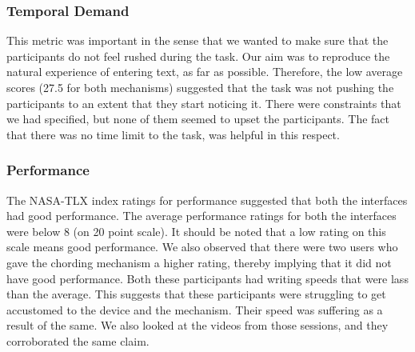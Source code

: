 \subsubsection{Temporal Demand}
This metric was important in the sense that we wanted to make sure that the participants do not feel rushed during the task. Our aim was to reproduce the natural experience of entering text, as far as possible. Therefore, the low average scores (27.5 for both mechanisms) suggested that the task was not pushing the participants to an extent that they start noticing it. There were constraints that we had specified, but none of them seemed to upset the participants. The fact that there was no time limit to the task, was helpful in this respect. 
\subsubsection{Performance}
The NASA-TLX index ratings for performance suggested that both the interfaces had good performance. The average performance ratings for both the interfaces were below 8 (on 20 point scale). It should be noted that a low rating on this scale means good performance. We also observed that there were two users who gave the chording mechanism a higher rating, thereby implying that it did not have good performance. Both these participants had writing speeds that were lass than the average. This suggests that these participants were struggling to get accustomed to the device and the mechanism. Their speed was suffering as a result of the same. We also looked at the videos from those sessions, and they corroborated the same claim.
